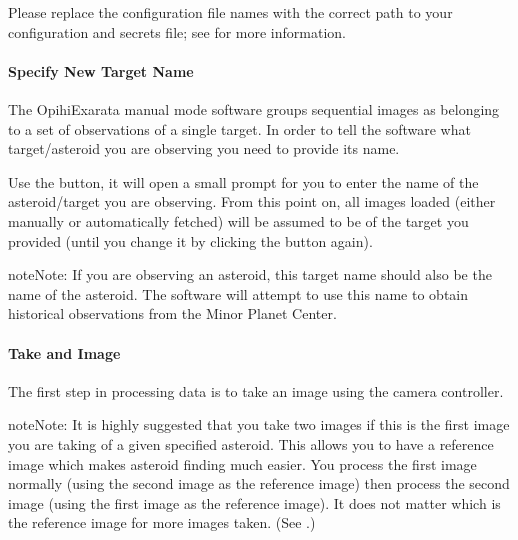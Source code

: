 \documentclass[letterpaper,11pt,english]{sphinxmanual}
\begin{document}
\begin{sphinxVerbatim}[commandchars=\\\{\}]
   
\end{sphinxVerbatim}

\sphinxAtStartPar
Please replace the configuration file names with the correct path to your
configuration and secrets file; see {\hyperref[\detokenize{user/configuration:user-configuration}]{}} for more
information.


\paragraph{Specify New Target Name}
\label{\detokenize{user/manual_mode:specify-new-target-name}}\label{\detokenize{user/manual_mode:user-manual-mode-procedure-specify-new-target-name}}
\sphinxAtStartPar
The OpihiExarata manual mode software groups sequential images as belonging to
a set of observations of a single target. In order to tell the software what
target/asteroid you are observing you need to provide its name.

\sphinxAtStartPar
Use the  button, it will open a small prompt for you to
enter the name of the asteroid/target you are observing. From this point on,
all images loaded (either manually or automatically fetched) will be assumed
to be of the target you provided (until you change it by clicking the button
again).

\begin{sphinxadmonition}{note}{Note:}
\sphinxAtStartPar
If you are observing an asteroid, this target name should also be the name
of the asteroid. The software will attempt to use this name to obtain
historical observations from the Minor Planet Center.
\end{sphinxadmonition}


\paragraph{Take and Image}
\label{\detokenize{user/manual_mode:take-and-image}}
\sphinxAtStartPar
The first step in processing data is to take an image using the camera
controller.

\begin{sphinxadmonition}{note}{Note:}
\sphinxAtStartPar
It is highly suggested that you take two images if this is the first image
you are taking of a given specified asteroid. This allows you to have a
reference image which makes asteroid finding much easier. You process the
first image normally (using the second image as the reference image) then
process the second image (using the first image as the reference image).
It does not matter which is the reference image for more images taken. (See
{\hyperref[\detokenize{user/manual_mode:user-manual-mode-procedure-find-asteroid-location}]{}}.)
\end{sphinxadmonition}
\end{document}
